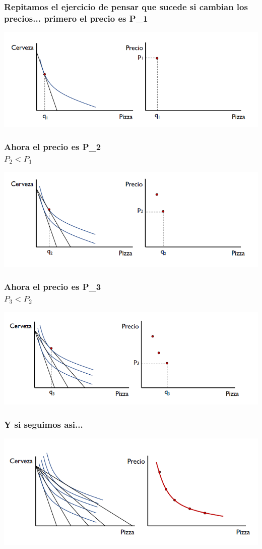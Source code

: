 \documentclass{beamer}
\begin{document}
\begin{frame}
\frametitle{ Repitamos el ejercicio de pensar que sucede si cambian los precios... primero el precio es P_1}
\centering
\includegraphics[scale=0.6]{Figures/Tema_02.53_derivacioncurvademanda.png}
\end{frame}

\begin{frame}
\frametitle{ Ahora el precio es P_2 \\ $P_2 < P_1 $ }
\centering
\includegraphics[scale=0.6]{Figures/Tema_02.54_derivacioncurvademanda1.png}
\end{frame}

\begin{frame}
\frametitle{ Ahora el precio es P_3 \\ $P_3 < P_2 $}
\centering
\includegraphics[scale=0.6]{Figures/Tema_02.55_derivacioncurvademanda2.png}
\end{frame}

\begin{frame}
\frametitle{ Y si seguimos asi...}
\centering
\includegraphics[scale=0.6]{Figures/Tema_02.56_derivacioncurvademanda3.png}
\end{frame}
\end{document}
